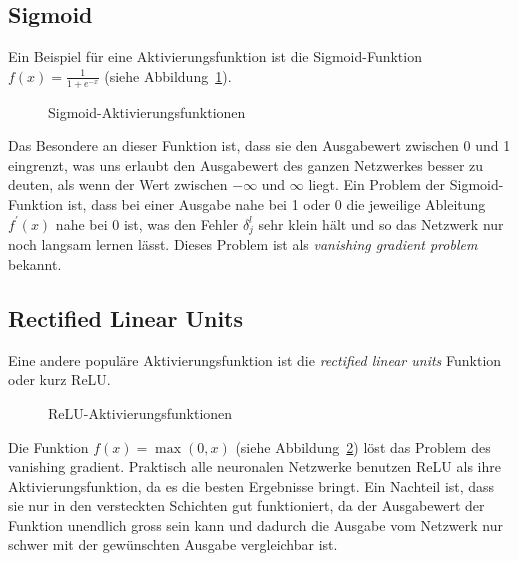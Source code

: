 \documentclass[12pt,a4paper]{report}
\begin{document}
\subsection{Sigmoid}
Ein Beispiel für eine Aktivierungsfunktion ist die Sigmoid-Funktion $f(x) = \frac{1}{1 + e^{-x}}$ (siehe Abbildung~\ref{fig:activation1}).
\begin{figure}[!h]
    \centering
{}
    \caption{Sigmoid-Aktivierungsfunktionen}
    \label{fig:activation1}
\end{figure}
Das Besondere an dieser Funktion ist, dass sie den Ausgabewert zwischen 0 und 1 eingrenzt, was uns erlaubt den Ausgabewert des ganzen
Netzwerkes besser zu deuten, als wenn der Wert zwischen $-\infty$ und $\infty$ liegt.
Ein Problem der Sigmoid-Funktion ist, dass bei einer Ausgabe nahe bei 1 oder 0 die jeweilige Ableitung $f^\prime(x)$ nahe bei 0 ist,
was den Fehler $\delta^l_j$ sehr klein hält und so das Netzwerk nur noch langsam lernen lässt.
Dieses Problem ist als \textit{vanishing gradient problem} bekannt.
\subsection{Rectified Linear Units}
Eine andere populäre Aktivierungsfunktion ist die \textit{rectified linear units} Funktion oder kurz ReLU.
\begin{figure}[!h]
    \centering
{}
    \caption{ReLU-Aktivierungsfunktionen}
    \label{fig:activation2}
\end{figure}
Die Funktion $f(x) = \max(0, x)$ (siehe Abbildung~\ref{fig:activation2}) löst das Problem des vanishing gradient.
Praktisch alle neuronalen Netzwerke benutzen ReLU als ihre Aktivierungsfunktion,
da es die besten Ergebnisse bringt\cite{activations}.
Ein Nachteil ist, dass sie nur in den versteckten Schichten gut funktioniert,
da der Ausgabewert der Funktion unendlich gross sein kann und dadurch die Ausgabe vom Netzwerk nur schwer mit der gewünschten Ausgabe vergleichbar ist.
\end{document}
